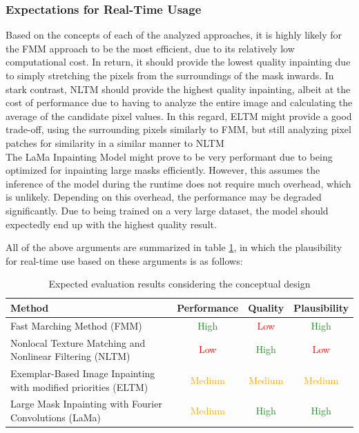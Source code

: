 \subsubsection{Expectations for Real-Time Usage}

Based on the concepts of each of the analyzed approaches, it is highly likely for the FMM approach to be the most efficient, due to its relatively low computational cost. In return, it should provide the lowest quality inpainting due to simply stretching the pixels from the surroundings of the mask inwards.
In stark contrast, NLTM should provide the highest quality inpainting, albeit at the cost of performance due to having to analyze the entire image and calculating the average of the candidate pixel values. In this regard, ELTM might provide a good trade-off, using the surrounding pixels similarly to FMM, but still analyzing pixel patches for similarity in a similar manner to NLTM
\\The LaMa Inpainting Model might prove to be very performant due to being optimized for inpainting large masks efficiently. However, this assumes the inference of the model during the runtime does not require much overhead, which is unlikely. Depending on this overhead, the performance may be degraded significantly. Due to being trained on a very large dataset, the model should expectedly end up with the highest quality result.

All of the above arguments are summarized in table \ref{table:inpaintingExpectations}, in which the plausibility for real-time use based on these arguments is as follows:

\begin{table}[h!]
\centering
\begin{tabular}{|p{17em}|c|c|c|}
  \hline
  \textbf{Method}& \textbf{Performance} & \textbf{Quality} & \textbf{Plausibility} \\
  \hline
  Fast Marching Method (FMM) \cite{TeleaFastMarching2004} & \textcolor{ForestGreen}{High} & \textcolor{red}{Low} & \textcolor{ForestGreen}{High} \\
  \hline
  Nonlocal Texture Matching and Nonlinear Filtering (NLTM) \cite{DingRam2019} & \textcolor{red}{Low} & \textcolor{ForestGreen}{High} & \textcolor{red}{Low} \\
  \hline
  Exemplar-Based Image Inpainting with modified priorities (ELTM) \cite{DengLiang-Jian2015EIIU} & \textcolor{orange}{Medium} & \textcolor{orange}{Medium} & \textcolor{orange}{Medium} \\
  \hline
  Large Mask Inpainting with Fourier Convolutions (LaMa) \cite{SuvorovRoman2022RLMI} & \textcolor{orange}{Medium} & \textcolor{ForestGreen}{High} & \textcolor{ForestGreen}{High} \\
  \hline
\end{tabular}
\caption{Expected evaluation results considering the conceptual design}
\label{table:inpaintingExpectations}
\end{table}